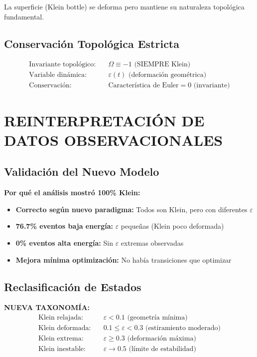 \documentclass[12pt,a4paper]{article}
\begin{document}
La superficie (Klein bottle) se deforma pero mantiene su naturaleza topológica fundamental.

\subsection{Conservación Topológica Estricta}

\begin{align}
\text{Invariante topológico:} &\quad \Omega \equiv -1 \text{ (SIEMPRE Klein)}\\
\text{Variable dinámica:} &\quad \varepsilon(t) \text{ (deformación geométrica)}\\
\text{Conservación:} &\quad \text{Característica de Euler} = 0 \text{ (invariante)}
\end{align}

\section{REINTERPRETACIÓN DE DATOS OBSERVACIONALES}

\subsection{Validación del Nuevo Modelo}

\textbf{Por qué el análisis mostró 100\% Klein:}
\begin{itemize}
\item[\checkmark] \textbf{Correcto según nuevo paradigma:} Todos son Klein, pero con diferentes $\varepsilon$
\item[\checkmark] \textbf{76.7\% eventos baja energía:} $\varepsilon$ pequeñas (Klein poco deformada)
\item[\checkmark] \textbf{0\% eventos alta energía:} Sin $\varepsilon$ extremas observadas
\item[\checkmark] \textbf{Mejora mínima optimización:} No había transiciones que optimizar
\end{itemize}

\subsection{Reclasificación de Estados}

\textbf{NUEVA TAXONOMÍA:}
\begin{align}
\text{Klein relajada:} &\quad \varepsilon < 0.1 \text{ (geometría mínima)}\\
\text{Klein deformada:} &\quad 0.1 \leq \varepsilon < 0.3 \text{ (estiramiento moderado)}\\
\text{Klein extrema:} &\quad \varepsilon \geq 0.3 \text{ (deformación máxima)}\\
\text{Klein inestable:} &\quad \varepsilon \to 0.5 \text{ (límite de estabilidad)}
\end{align}
\end{document}
